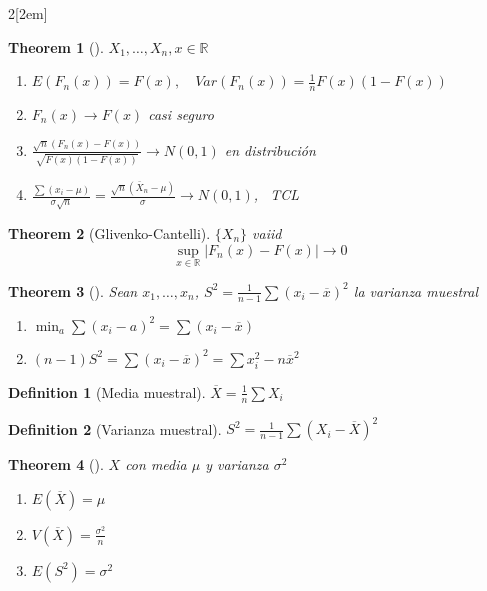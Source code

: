 \documentclass[leqno]{article}
\newtheorem*{theorem}{Theorem}
\newtheorem*{definition}{Definition}
\begin{document}
\begin{multicols}{2}[\columnsep2em]
\begin{theorem}[]$X_1, \ldots, X_n, x \in \mathbb{R}$
  \begin{enumerate}[topsep=-6pt, itemsep=0pt]
	\item $E(F_n(x))=F(x), \quad Var(F_n(x))= \frac{1}{n}F(x)(1-F(x))$
	\item $F_n(x) \to  F(x)$ casi seguro
	\item $\frac{\sqrt{n} (F_n(x)-F(x))}{\sqrt{F(x)(1-F(x))} } \to  N(0,1)$ en distribución
	\item $\frac{\sum (x_i -\mu)}{\sigma \sqrt{n}} = \frac{\sqrt{n} (\bar{X}_n-\mu) }{\sigma } \to N(0,1)$, \ TCL
  \end{enumerate}
\end{theorem}

\begin{theorem}[Glivenko-Cantelli] $\{X_n\}$ vaiid 
  \[
	\sup_{x\in \mathbb{R}} |F_n(x)-F(x)| \to 0
  \] 
\end{theorem}

\begin{theorem}[]
Sean $x_1, \ldots, x_n$,  $S^2 =\frac{1}{n-1}\sum (x_i-\overline{x}) ^2$ la varianza muestral
\begin{enumerate}[topsep=-6pt, itemsep=0pt]
  \item $\min_a \sum (x_i-a)^2 = \sum (x_i-\overline{x})$ 
  \item $(n-1)S^2 = \sum (x_i-\overline{x})^2 = \sum x_i^2-n\overline{x}^2$
\end{enumerate}
\end{theorem}

\begin{definition}[Media muestral]
$\overline{X} = \frac{1}{n}\sum X_i$
\end{definition}

\begin{definition}[Varianza muestral]
$S^2 = \frac{1}{n-1}\sum (X_i-\overline{X})^2$
\end{definition}

\begin{theorem}[] $X$ con media  $\mu$ y varianza $\sigma ^2$  
\begin{enumerate}[topsep=-6pt, itemsep=0pt]
  \item $E(\overline{X}) = \mu$
  \item $V(\overline{X}) = \frac{\sigma ^2}{n}$ 
  \item $E(S^2)=\sigma ^2$
\end{enumerate}
\end{theorem}


\end{multicols}
\end{document}
